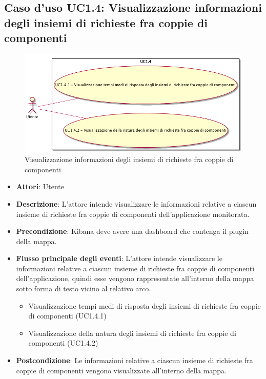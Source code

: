 \subsection{Caso d'uso UC1.4: Visualizzazione informazioni degli insiemi di richieste fra coppie di componenti}
\begin{figure} [H]
\centering
\includegraphics[scale=0.45]{./UC/UC1-4.png}
\caption{Visualizzazione informazioni degli insiemi di richieste fra coppie di componenti}\label{}
\end{figure}
\begin{itemize}
\item \textbf{Attori}: Utente
\item \textbf{Descrizione}: L'attore intende visualizzare le informazioni relative a ciascun insieme di richieste fra coppie di componenti dell'applicazione monitorata.
\item \textbf{Precondizione}: Kibana deve avere una dashboard che contenga il plugin della mappa.
\item \textbf{Flusso principale degli eventi}: L'attore intende visualizzare le informazioni relative a ciascun insieme di richieste fra coppie di componenti dell'applicazione, quindi esse vengono rappresentate all'interno della mappa sotto forma di testo vicino al relativo arco.
\begin{itemize}
\item Visualizzazione tempi medi di risposta degli insiemi di richieste fra coppie di componenti (UC1.4.1)
\item Visualizzazione della natura degli insiemi di richieste fra coppie di componenti (UC1.4.2)
\end{itemize}
\item \textbf{Postcondizione}: Le informazioni relative a ciascun insieme di richieste fra coppie di componenti vengono visualizzate all'interno della mappa.
\end{itemize}
